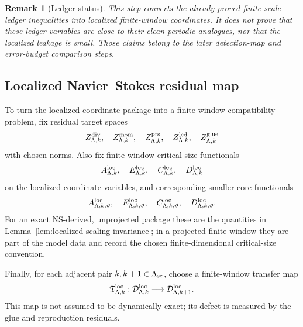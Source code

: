\documentclass[11pt]{article}
\numberwithin{equation}{section}
\newtheorem{remark}[theorem]{Remark}
\begin{document}
\begin{remark}[Ledger status]
This step converts the already-proved finite-scale ledger inequalities
into localized finite-window coordinates.  It does not prove that these
ledger variables are close to their clean periodic analogues, nor that the
localized leakage is small.  Those claims belong to the later detection-map
and error-budget comparison steps.
\end{remark}

\subsection{Localized Navier--Stokes residual map}\label{subsec:localized-residual-map}

To turn the localized coordinate package into a finite-window compatibility
problem, fix residual target spaces
\[
        Z_{\Lambda,k}^{\rm div},\quad
        Z_{\Lambda,k}^{\rm mom},\quad
        Z_{\Lambda,k}^{\rm prs},\quad
        Z_{\Lambda,k}^{\rm led},\quad
        Z_{\Lambda,k}^{\rm glue}
\]
with chosen norms.  Also fix finite-window critical-size functionals
\[
        A_{\Lambda,k}^{\rm loc},\quad
        E_{\Lambda,k}^{\rm loc},\quad
        C_{\Lambda,k}^{\rm loc},\quad
        D_{\Lambda,k}^{\rm loc}
\]
on the localized coordinate variables, and corresponding smaller-core
functionals
\[
        A_{\Lambda,k,\vartheta}^{\rm loc},\quad
        E_{\Lambda,k,\vartheta}^{\rm loc},\quad
        C_{\Lambda,k,\vartheta}^{\rm loc},\quad
        D_{\Lambda,k,\vartheta}^{\rm loc}.
\]
For an exact NS-derived, unprojected package these are the quantities in
Lemma~\ref{lem:localized-scaling-invariance}; in a projected finite window
they are part of the model data and record the chosen finite-dimensional
critical-size convention.

Finally, for each adjacent pair \(k,k+1\in\Lambda_{\rm sc}\), choose a
finite-window transfer map
\[
        \mathfrak T_{\Lambda,k}^{\rm loc}:
        \mathcal D_{\Lambda,k}^{\rm loc}
        \longrightarrow
        \mathcal D_{\Lambda,k+1}^{\rm loc}.
\]
This map is not assumed to be dynamically exact; its defect is measured by
the glue and reproduction residuals.
\end{document}
